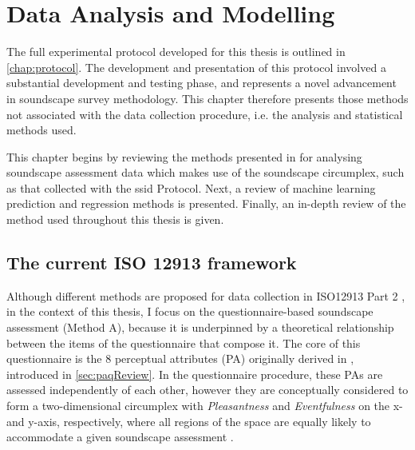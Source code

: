 \chapter{Data Analysis and Modelling}
\label{chap:methods}

 The full experimental protocol developed for this thesis is outlined in \cref{chap:protocol}. The development and presentation of this protocol involved a substantial development and testing phase, and represents a novel advancement in soundscape survey methodology. This chapter therefore presents those methods not associated with the data collection procedure, i.e. the analysis and statistical methods used.

This chapter begins by reviewing the methods presented in \citet{ISO12913Part2} for analysing soundscape assessment data which makes use of the soundscape circumplex, such as that collected with the \gls{ssid} Protocol. Next, a review of machine learning prediction and regression methods is presented. Finally, an in-depth review of the  method used throughout this thesis is given. 

\section{The current ISO 12913 framework}
\label{sec:current}
Although different methods are proposed for data collection in ISO12913 Part 2 \citep{ISO12913Part2}, in the context of this thesis, I focus on the questionnaire-based soundscape assessment (Method A), because it is underpinned by a theoretical relationship between the items of the questionnaire that compose it. The core of this questionnaire is the 8 perceptual attributes (PA) originally derived in \citet{Axelsson2010principal}, introduced in \cref{sec:paqReview}. In the questionnaire procedure, these PAs are assessed independently of each other, however they are conceptually considered to form a two-dimensional circumplex with \textit{Pleasantness} and \textit{Eventfulness} on the x- and y-axis, respectively, where all regions of the space are equally likely to accommodate a given soundscape assessment \citep{Aletta2016Soundscape}. 

